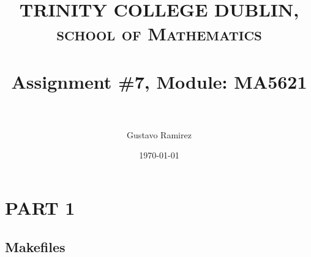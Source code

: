 \documentclass[paper=a4, fontsize=11pt]{scrartcl} %
\title{	
\normalfont \normalsize 
\textsc{TRINITY COLLEGE DUBLIN, school of Mathematics} \\ [25pt] %
\horrule{0.5pt} \\[0.4cm] %
\huge Assignment \#7, Module: MA5621 \\ %
\horrule{2pt} \\[0.5cm] %
}
\author{Gustavo Ramirez} %
\date{\normalsize\today} %
\numberwithin{equation}{section} %
\numberwithin{figure}{section} %
\numberwithin{table}{section} %
\begin{document}
\maketitle %


\begin{comment}
\section{Problem description}

\begin{enumerate}
\item 
\item 
\item 
\item 
\end{enumerate}

\end{comment}

\newpage


\begin{comment}

USEFUL LINKS:

official sources for terminology:
-----
http://www.intel.com/content/www/us/en/support/topics/glossary.html
https://www-01.ibm.com/software/globalization/terminology/a.html
-----




about IMB processors:
-----

insert in google: list of ibm processors
https://en.wikipedia.org/wiki/List_of_IBM_products
https://www-01.ibm.com/software/passportadvantage/guide_to_identifying_processor_family.html
http://www.nextplatform.com/2015/08/10/ibm-roadmap-extends-power-chips-to-2020-and-beyond/
http://www.theverge.com/2015/7/9/8919091/ibm-7nm-transistor-processor
https://www.ibm.com/developerworks/ibmi/library/i-ibmi-7_2-and-ibm-power8/
-----




\end{comment}

\section{PART 1}

\subsection{Makefiles}
\end{document}
